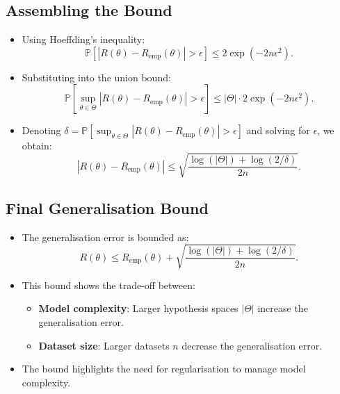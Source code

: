 \subsection{Assembling the Bound}

\begin{itemize}
    \item Using Hoeffding's inequality:
    \[
    \mathbb{P} \left[ |R(\theta) - R_{\text{emp}}(\theta)| > \epsilon \right] \leq 2 \exp(-2n\epsilon^2).
    \]
    \item Substituting into the union bound:
    \[
    \mathbb{P} \left[ \sup_{\theta \in \Theta} |R(\theta) - R_{\text{emp}}(\theta)| > \epsilon \right] \leq |\Theta| \cdot 2 \exp(-2n\epsilon^2).
    \]
    \item Denoting $\delta = \mathbb{P} \left[ \sup_{\theta \in \Theta} |R(\theta) - R_{\text{emp}}(\theta)| > \epsilon \right]$ and solving for $\epsilon$, we obtain:
    \[
    |R(\theta) - R_{\text{emp}}(\theta)| \leq \sqrt{\frac{\log(|\Theta|) + \log(2/\delta)}{2n}}.
    \]
\end{itemize}

\subsection{Final Generalisation Bound}

\begin{itemize}
    \item The generalisation error is bounded as:
    \[
    R(\theta) \leq R_{\text{emp}}(\theta) + \sqrt{\frac{\log(|\Theta|) + \log(2/\delta)}{2n}}.
    \]
    \item This bound shows the trade-off between:
    \begin{itemize}
        \item \textbf{Model complexity}: Larger hypothesis spaces $|\Theta|$ increase the generalisation error.
        \item \textbf{Dataset size}: Larger datasets $n$ decrease the generalisation error.
    \end{itemize}
    \item The bound highlights the need for regularisation to manage model complexity.
\end{itemize}
